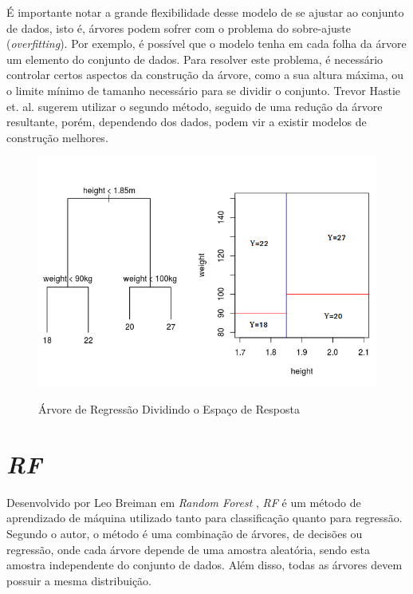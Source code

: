 É importante notar a grande flexibilidade desse modelo de se ajustar ao conjunto de dados, isto é, árvores podem sofrer com o problema do sobre-ajuste (\textit{overfitting}). Por exemplo, é possível que o modelo tenha em cada folha da árvore um elemento do conjunto de dados. Para resolver este problema, é necessário controlar certos aspectos da construção da árvore, como a sua altura máxima, ou o limite mínimo de tamanho necessário para se dividir o conjunto. Trevor Hastie et. al. \cite{hastie2005elements} sugerem utilizar o segundo método, seguido de uma redução da árvore resultante, porém, dependendo dos dados, podem vir a existir modelos de construção melhores.
 
 \begin{figure}[htbp]
    \centering
    \includegraphics[scale=0.6]{monography/img/models/regression_tree.png}
    \label{figure:tree}
    \caption[Árvore de Regressão Dividindo o Espaço de Resposta]{Árvore de Regressão Dividindo o Espaço de Resposta\footnotemark}
\end{figure}


\section{\textit{\acrfull{RF}}}

Desenvolvido por Leo Breiman em \textit{Random Forest} \cite{Breiman:2001:RF:570181.570182}, \textit{\acrshort{RF}} é um método de aprendizado de máquina utilizado tanto para classificação quanto para regressão. Segundo o autor, o método é uma combinação de árvores, de decisões ou regressão, onde cada árvore depende de uma amostra aleatória, sendo esta amostra independente do conjunto de dados. Além disso, todas as árvores devem possuir a mesma distribuição. 

